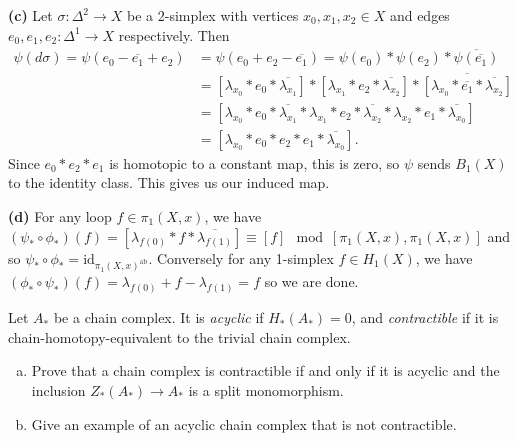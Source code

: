 \documentclass[11pt,letterpaper]{article}
\begin{document}
\begin{solution}
    \textbf{(c)} Let $\sigma : \Delta^2 \to X$ be a $2$-simplex with vertices $x_0, x_1, x_2 \in X$ and edges $e_0, e_1, e_2 : \Delta^1 \to X$ respectively. Then
    \[
        \begin{aligned}
            \psi(d\sigma) = \psi(e_0 - \overline{e_1} + e_2) &= \psi(e_0 + e_2 - \overline{e_1}) = \psi(e_0) * \psi(e_2) * \overline{\psi(\overline{e_1})}\\
            &=[\lambda_{x_0} * e_0 * \overline{\lambda_{x_1}}] * [\lambda_{x_1} * e_2 * \overline{\lambda_{x_2}}] * \overline{[\lambda_{x_0} * \overline{e_1} * \overline{\lambda_{x_2}}]}\\
            &=[\lambda_{x_0} * e_0 * \overline{\lambda_{x_1}} * \lambda_{x_1} * e_2 * \overline{\lambda_{x_2}} * \lambda_{x_2} * e_1 * \overline{\lambda_{x_0}}]\\
            &=[\lambda_{x_0} * e_0 * e_2 * e_1 * \overline{\lambda_{x_0}}].
        \end{aligned}
    \]  
    Since $e_0 * e_2 * e_1$ is homotopic to a constant map, this is zero, so $\psi$ sends $B_1(X)$to the identity class. This gives us our induced map.

    \textbf{(d)} For any loop $f\in \pi_1(X,x)$, we have $(\psi_*\circ \phi_*)(f) = [\lambda_{f(0)}*f*\overline{\lambda_{f(1)}}] \equiv [f]\mod [\pi_1(X,x), \pi_1(X,x)]$ and so $\psi_*\circ \phi_* = \text{id}_{\pi_1(X,x)^\text{ab}}$. Conversely for any 1-simplex $f\in H_1(X)$, we have $(\phi_*\circ\psi_*)(f)=\lambda_{f(0)}+f-\lambda_{f(1)}=f$ so we are done.  
\end{solution}

\begin{problem}
    Let $A_*$ be a chain complex. It is \emph{acyclic} if $H_*(A_*)=0$, and \emph{contractible} if it is chain-homotopy-equivalent to the trivial chain complex. 
    \begin{enumerate}[(a)]
        \item Prove that a chain complex is contractible if and only if it is acyclic and the inclusion $Z_*(A_*)\to A_*$ is a split monomorphism.
        \item Give an example of an acyclic chain complex that is not contractible. 
    \end{enumerate}
\end{problem}
\end{document}
